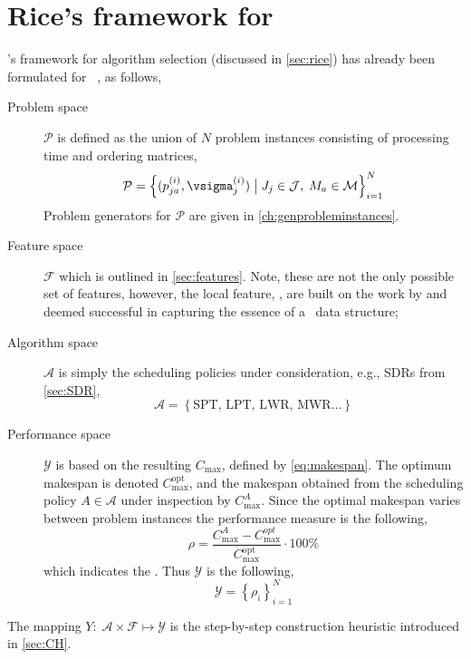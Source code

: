 \section{Rice's framework for \jsp}\label{sec:rice:jsp}
\citeauthor{Rice76}'s framework for algorithm selection (discussed in \cref{sec:rice}) has already been formulated for \jsp\ \citep[cf.][]{SmithMilesLion3,SmithMilesLion5,InRu12}, as follows, 
\begin{description} 
\item[Problem space] $\mathcal{P}$ is defined as the union of $N$ problem instances consisting of processing time and ordering matrices,
\begin{equation} 
\mathcal{P}=\left\{(p_{ja}^{(i)},\vsigma_j^{(i)})\;\big|\;J_j\in\mathcal{J},\;M_a\in\mathcal{M}\right\}_{i=1}^{N}
\end{equation}
Problem generators for $\mathcal{P}$ are given in \cref{ch:genprobleminstances}.
\item[Feature space] $\mathcal{F}$ which is outlined in \cref{sec:features}. Note, these are not the only possible set of features, however, the local feature, \phiLocalRelated, are built on the work by \cite{InRu11a,SmithMilesLion3} and deemed successful in capturing the essence of a \jsp\ data structure;
\item[Algorithm space] $\mathcal{A}$ is simply the scheduling policies under consideration, e.g., SDRs from \cref{sec:SDR},
\begin{equation}
\mathcal{A}=\left\{\text{SPT,~LPT,~LWR,~MWR}\dotsc\right\}
\end{equation} 
\item[Performance space] $\mathcal{Y}$ is based on the resulting $C_{\max}$, defined by \cref{eq:makespan}. The optimum makespan is denoted $C_{\max}^{\text{opt}}$, and the makespan obtained from the scheduling policy $A\in\mathcal{A}$ under inspection by $C_{\max}^{A}$. Since the optimal makespan varies between problem instances the performance measure is the following, 
\begin{equation}\label{eq:rho}
\rho=\frac{C_{\max}^{A}-C_{\max}^{opt}}{C_{\max}^{\text{opt}}}\cdot 100\%
\end{equation}
which indicates the \namerho. Thus $\mathcal{Y}$ is the following, 
\begin{equation}
\mathcal{Y}=\left\{\rho_i\right\}_{i=1}^{N}
\end{equation}
\end{description}
The mapping $Y:\;\mathcal{A}\times\mathcal{F} \mapsto \mathcal{Y}$ is the step-by-step construction heuristic introduced in \cref{sec:CH}.